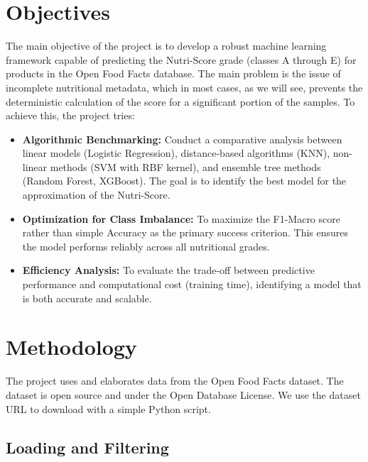 \documentclass[11pt,a4paper]{article}
\begin{document}
\section{Objectives}

The main objective of the project is to develop a robust machine learning framework capable of predicting the Nutri-Score grade (classes A through E) for products in the Open Food Facts database. The main problem is the issue of incomplete nutritional metadata, which in most cases, as we will see, prevents the deterministic calculation of the score for a significant portion of the samples.
To achieve this, the project tries:
\begin{itemize}
    \item \textbf{Algorithmic Benchmarking:} Conduct a comparative analysis between linear models (Logistic Regression), distance-based algorithms (KNN), non-linear methods (SVM with RBF kernel), and ensemble tree methods (Random Forest, XGBoost). The goal is to identify the best model for the approximation of the Nutri-Score.
    \item \textbf{Optimization for Class Imbalance:} To maximize the F1-Macro score rather than simple Accuracy as the primary success criterion. This ensures the model performs reliably across all nutritional grades.
    \item \textbf{Efficiency Analysis:} To evaluate the trade-off between predictive performance and computational cost (training time), identifying a model that is both accurate and scalable.
\end{itemize}

\section{Methodology}

The project uses and elaborates data from the Open Food Facts dataset. The dataset is open source and under the Open Database License. We use the dataset URL to download with a simple Python script.

\subsection{Loading and Filtering}
\end{document}

